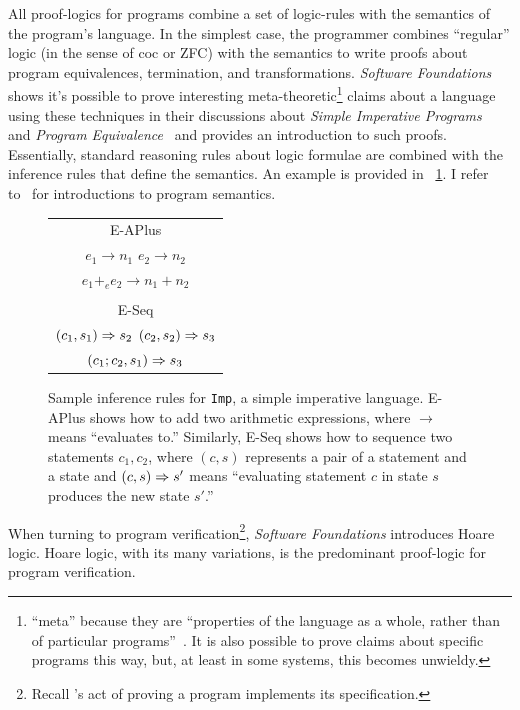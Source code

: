 All proof-logics for programs combine a set of logic-rules with the semantics of
the program's language. In the simplest case, the programmer combines
``regular'' logic (in the sense of \gls{coc} or ZFC) with the semantics to write
proofs about program equivalences, termination, and transformations.
\emph{Software Foundations} shows it's possible to prove interesting
meta-theoretic\footnote{``meta'' because they are ``properties of the language
as a whole, rather than of particular programs''~\cite{Pierce:SF2}. It is also
possible to prove claims about specific programs this way, but, at least in some
systems, this becomes unwieldy.} claims about a language using these techniques
in their discussions about \emph{Simple Imperative Programs}~\cite{Pierce:SF1}
and \emph{Program Equivalence}~\cite{Pierce:SF2} and provides an introduction to
such proofs. Essentially, standard reasoning rules about logic formulae are
combined with the inference rules that define the semantics. An example is
provided in \figurename~\ref{F:Imp_ex}. I refer
to~\cite{Winskel_1993,Harper_2016} for introductions to program semantics.

\begin{figure}
    \centering
    \begin{tabular}{c}
        E-APlus \\
        \(e_1 \to n_1\) \quad \(e_2 \to n_2\) \\
        \midrule
        \(e_1 +_e e_2 \to n_1 + n_2\) \\

        \\

        E-Seq \\
        \((c_1, s_1) \mathrel{\Rightarrow} s_2\) \quad \((c_2, s_2) \mathrel{\Rightarrow} s_3\) \\
        \midrule
        \((c_1;c_2, s_1) \mathrel{\Rightarrow} s_3\)
    \end{tabular}
    \caption{Sample inference rules for \texttt{Imp}, a simple imperative
    language. E-APlus shows how to add two arithmetic expressions, where \(\to\)
    means ``evaluates to.'' Similarly, E-Seq shows how to sequence two
    statements \(c_1, c_2\), where \((c, s)\) represents a pair of a statement
    and a state and \((c, s) \mathrel{\Rightarrow} s'\) means ``evaluating statement \(c\) in
    state \(s\) produces the new state \(s'\).''}\label{F:Imp_ex}
\end{figure}

When turning to program verification\footnote{Recall \citeauthor{EWD:EWD1036}'s
act of proving a program implements its specification.}, \emph{Software
Foundations} introduces Hoare logic. Hoare logic, with its many variations, is
the predominant proof-logic for program verification.

